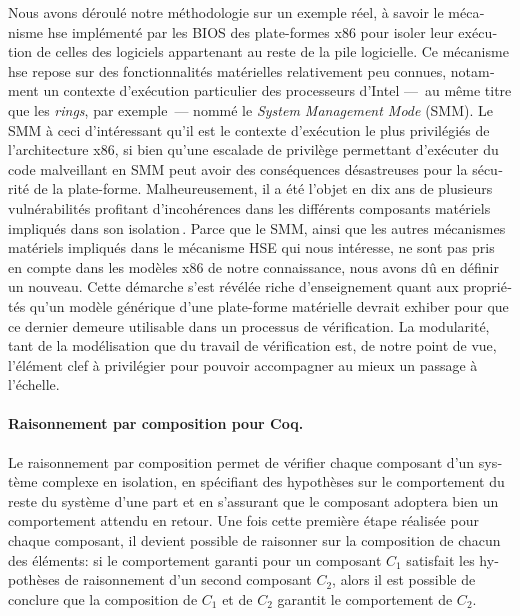 \begin{otherlanguage}{french}
  Nous avons déroulé notre méthodologie sur un exemple réel, à savoir le
  mécanisme \ac{hse} implémenté par les BIOS des plate-formes x86 pour isoler
  leur exécution de celles des logiciels appartenant au reste de la pile logicielle.
  Ce mécanisme \ac{hse} repose sur des fonctionnalités matérielles relativement
  peu connues, notamment un contexte d’exécution particulier des
  processeurs d’Intel ---~au même titre que les \emph{rings}, par exemple~---
  nommé le \emph{System Management Mode} (SMM).
  Le SMM à ceci d’intéressant qu’il est le contexte d’exécution le plus
  privilégiés de l’architecture x86, si bien qu’une escalade de privilège
  permettant d’exécuter du code malveillant en SMM peut avoir des conséquences
  désastreuses pour la sécurité de la plate-forme.
  Malheureusement, il a été l’objet en dix ans de plusieurs vulnérabilités
  profitant d’incohérences dans les différents composants matériels impliqués
  dans son  isolation\,\cite{duflot2009smram,wojtczuk2009smram,domas2015sinkhole}.
  Parce que le SMM, ainsi que les autres mécanismes matériels impliqués dans le
  mécanisme HSE qui nous intéresse, ne sont pas pris en compte dans les modèles x86
  de notre connaissance, nous avons dû en définir un nouveau.
  Cette démarche s’est révélée riche d’enseignement quant aux propriétés qu’un
  modèle générique d’une plate-forme matérielle devrait exhiber pour
  que ce dernier demeure utilisable dans un processus de vérification.
  La modularité, tant de la modélisation que du travail de vérification est, de
  notre point de vue, l’élément clef à privilégier pour pouvoir accompagner au
  mieux un passage à l’échelle.

  \paragraph{Raisonnement par composition pour Coq.}
  Le raisonnement par composition permet de vérifier chaque composant d’un
  système complexe en isolation, en spécifiant des hypothèses sur le comportement
  du reste du système d’une part et en s’assurant que le composant adoptera bien
  un comportement attendu en retour.
  Une fois cette première étape réalisée pour chaque composant, il devient
  possible de raisonner sur la composition de chacun des éléments: si le
  comportement garanti pour un composant \( C_1 \) satisfait les hypothèses de
  raisonnement d’un second composant \( C_2 \), alors il est possible de
  conclure que la composition de \( C_1 \) et de \( C_2 \) garantit le
  comportement de \( C_2 \).


\end{otherlanguage}

